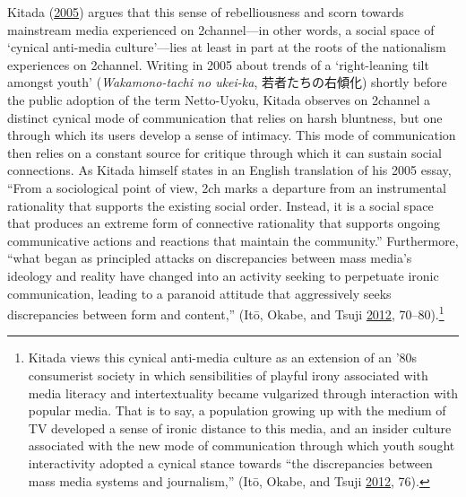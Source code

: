 \documentclass[10pt,british,A4paper,,openany]{memoir}
\begin{document}
Kitada (\protect\hyperlink{ref-kitada_eng:_2005}{2005}) argues that this
sense of rebelliousness and scorn towards mainstream media experienced
on 2channel---in other words, a social space of `cynical anti-media
culture'---lies at least in part at the roots of the nationalism
experiences on 2channel. Writing in 2005 about trends of a
`right-leaning tilt amongst youth' (\emph{Wakamono-tachi no ukei-ka},
若者たちの右傾化) shortly before the public adoption of the term
Netto-Uyoku, Kitada observes on 2channel a distinct cynical mode of
communication that relies on harsh bluntness, but one through which its
users develop a sense of intimacy. This mode of communication then
relies on a constant source for critique through which it can sustain
social connections. As Kitada himself states in an English translation
of his 2005 essay, ``From a sociological point of view, 2ch marks a
departure from an instrumental rationality that supports the existing
social order. Instead, it is a social space that produces an extreme
form of connective rationality that supports ongoing communicative
actions and reactions that maintain the community.'' Furthermore, ``what
began as principled attacks on discrepancies between mass media's
ideology and reality have changed into an activity seeking to perpetuate
ironic communication, leading to a paranoid attitude that aggressively
seeks discrepancies between form and content,'' (Itō, Okabe, and Tsuji
\protect\hyperlink{ref-ito_fandom_2012}{2012}, 70--80).\footnote{Kitada
  views this cynical anti-media culture as an extension of an '80s
  consumerist society in which sensibilities of playful irony associated
  with media literacy and intertextuality became vulgarized through
  interaction with popular media. That is to say, a population growing
  up with the medium of TV developed a sense of ironic distance to this
  media, and an insider culture associated with the new mode of
  communication through which youth sought interactivity adopted a
  cynical stance towards ``the discrepancies between mass media systems
  and journalism,'' (Itō, Okabe, and Tsuji
  \protect\hyperlink{ref-ito_fandom_2012}{2012}, 76).}
\end{document}
